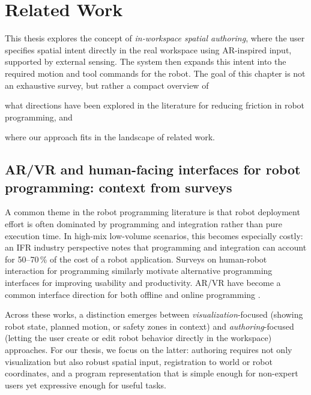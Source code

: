 \chapter{Related Work} \label{chapter:ch1_related_work}

This thesis explores the concept of \emph{in-workspace spatial authoring}, where the user specifies spatial intent directly in the real workspace using AR-inspired input, supported by external sensing. The system then expands this intent into the required motion and tool commands for the robot. The goal of this chapter is not an exhaustive survey, but rather a compact overview of
\begin{enumerate*}[label=(\roman*)]
    \item what directions have been explored in the literature for reducing friction in robot programming, and
    \item where our approach fits in the landscape of related work.
\end{enumerate*}

\section[AR/VR interfaces: context from surveys]{AR/VR and human-facing interfaces for robot programming: context from surveys}

A common theme in the robot programming literature is that robot deployment effort is often dominated by programming and integration rather than pure execution time. In high-mix low-volume scenarios, this becomes especially costly: an IFR industry perspective \cite{IFR2023TraditionalVsNew} notes that programming and integration can account for 50--70\,\% of the cost of a robot application. Surveys on human-robot interaction for programming \cite{VILLANI201866} similarly motivate alternative programming interfaces for improving usability and productivity. AR/VR have become a common interface direction for both offline and online programming \cite{Makhataeva2020, DIANATFAR2021407}.

Across these works, a distinction emerges between \emph{visualization}-focused (showing robot state, planned motion, or safety zones in context) and \emph{authoring}-focused (letting the user create or edit robot behavior directly in the workspace) approaches. For our thesis, we focus on the latter: authoring requires not only visualization but also robust spatial input, registration to world or robot coordinates, and a program representation that is simple enough for non-expert users yet expressive enough for useful tasks. 

